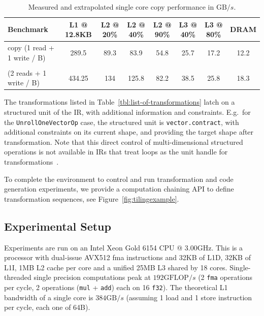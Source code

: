 \begin{table}[h!tb]
  \medskip
  \footnotesize
  \centering
  \begin{tabularx}{\textwidth}{X|ccccccc}
    \toprule
     \textbf{Benchmark}             & L1 @ 12.8KB & L2 @ 20\% & L2 @ 40\% & L2 @ 90\% & L3 @ 40\% & L3 @ 80\% & DRAM \\
    \midrule
        copy (1 read + 1 write / B) &     289.5   &    89.3   &    83.9     &    54.8   &   25.7    &   17.2    &  12.2 \\
    \hline
   \begin{tabular}{@{}l@{}}extrapolated \\ (2 reads + 1 write / B)\end{tabular} &    434.25  &    134    &   125.8   &    82.2   &   38.5    &   25.8    &  18.3 \\
    \bottomrule
  \end{tabularx}
  \smallskip
  \caption{Measured and extrapolated single core copy performance in $\mathrm{GB}/s$.}
  \label{tbl:measured-bandwidths}
\end{table}

The transformations listed in Table~\ref{tbl:list-of-transformations} latch on a structured unit of the IR, with additional information and constraints.
E.g.\ for the \lstinline|UnrollOneVectorOp| case, the structured unit is \lstinline|vector.contract|, with additional constraints on its current shape, and providing the target shape after transformation.
Note that this direct control of multi-dimensional structured operations is not available in IRs that treat loops as the unit handle for transformations~\cite{ragan2013halide, chen2018tvm, vasilache2019next}.

To complete the environment to control and run transformation and code generation experiments, we provide a computation chaining API to define transformation sequences, see Figure~\ref{fig:tilingexample}.

\subsection{Experimental Setup}

Experiments are run on an Intel Xeon Gold 6154 CPU @ $3.00\mathrm{GHz}$.
This is a processor with dual-issue AVX512 fma instructions and 32KB of L1D, 32KB of L1I, 1MB L2 cache per core and a unified 25MB L3 shared by 18 cores.
Single-threaded single precision computations peak at $192\mathrm{GFLOP}/s$ 
(2 \lstinline|fma| operations per cycle, 2 operations (\lstinline|mul| + \lstinline|add|) each on 16 \lstinline|f32|).
The theoretical L1 bandwidth of a single core is $384\mathrm{GB}/s$ (assuming 1 load and 1 store instruction per cycle, each one of 64B).


